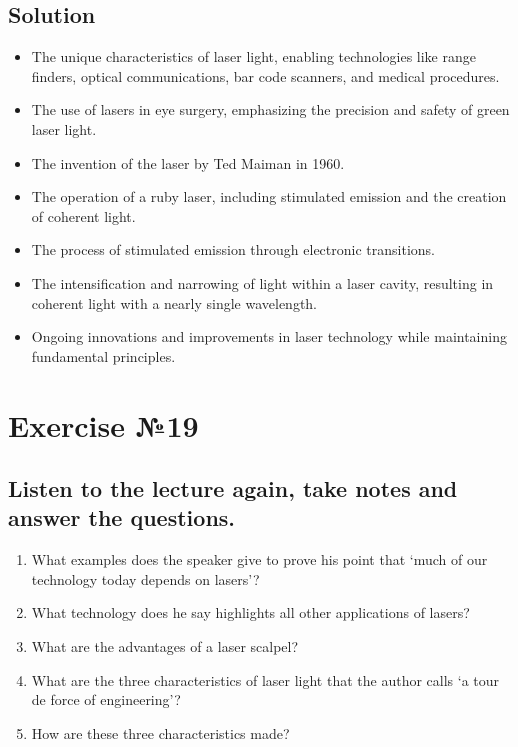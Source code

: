 \subsection*{Solution}
\begin{itemize}
      \item The unique characteristics of laser light, enabling technologies like range finders, optical communications, bar code scanners, and medical procedures.
      \item The use of lasers in eye surgery, emphasizing the precision and safety of green laser light.
      \item The invention of the laser by Ted Maiman in 1960.
      \item The operation of a ruby laser, including stimulated emission and the creation of coherent light.
      \item The process of stimulated emission through electronic transitions.
      \item The intensification and narrowing of light within a laser cavity, resulting in coherent light with a nearly single wavelength.
      \item Ongoing innovations and improvements in laser technology while maintaining fundamental principles.
\end{itemize}

\section{Exercise №19}
\subsection*{Listen to the lecture again, take notes and answer the questions.}

\begin{enumerate}
      \item What examples does the speaker give to prove his point that ‘much of our technology
            today depends on lasers’?
      \item What technology does he say highlights all other applications of lasers?
      \item What are the advantages of a laser scalpel?
      \item What are the three characteristics of laser light that the author calls ‘a tour de force of
            engineering’?
      \item How are these three characteristics made?
\end{enumerate}

